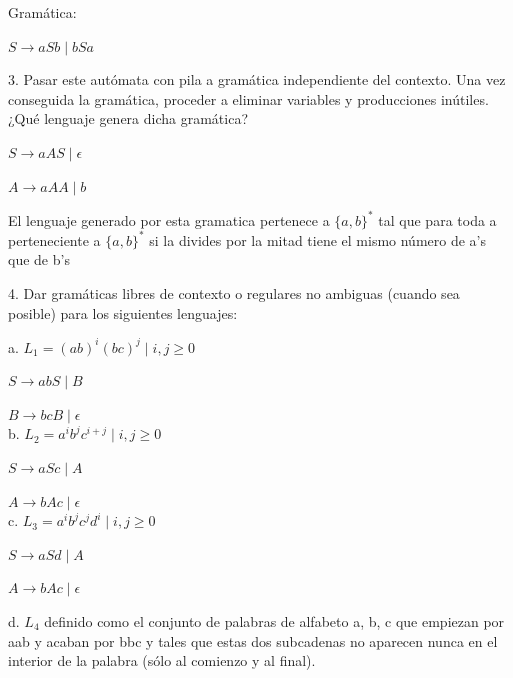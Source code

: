 \documentclass{article}
\begin{document}
\hspace{1cm} Gramática:

\hspace{2cm} $S \rightarrow aSb \mid bSa$

\vspace{0,65cm}

3. Pasar  este  autómata  con  pila  a  gramática  independiente  del  contexto.  Una  vez conseguida  la  gramática, proceder a  eliminar  variables  y  producciones inútiles.  ¿Qué lenguaje genera dicha gramática? 

\hspace{1cm} $S \rightarrow aAS \mid \epsilon$

\hspace{1cm} $A \rightarrow aAA \mid b$

El lenguaje generado por esta gramatica  pertenece a $\{a,b\}^{*}$ tal que para toda a perteneciente a $\{a,b\}^{*}$ si la divides por la mitad tiene el mismo número de a's que de b's

\vspace{0,65cm}

4. Dar gramáticas libres de contexto o regulares no ambiguas (cuando sea posible) para los siguientes lenguajes: 

\hspace{1cm} a. $L_{1} = {(ab)^{i}(bc)^{j} \mid i,j \ge  0}$

\hspace{2cm} 	$S \rightarrow abS \mid B$

\hspace{2cm} 	$B \rightarrow bcB \mid \epsilon$\\

\hspace{1cm} b. $L_{2} = {a^{i}b^{j}c^{i+j} \mid i,j \ge  0}$

\hspace{2cm} 	$S \rightarrow aSc \mid A$

\hspace{2cm} 	$A \rightarrow bAc \mid \epsilon$\\

\hspace{1cm} c. $L_{3} = {a^{i}b^{j}c^{j}d^{i} \mid i,j \ge  0}$

\hspace{2cm} 	$S \rightarrow aSd \mid A$

\hspace{2cm} 	$A \rightarrow bAc \mid \epsilon$

\hspace{1cm} d. $L_{4}$ definido como el conjunto de palabras de alfabeto {a, b, c} que empiezan por aab y acaban por bbc y tales que estas dos subcadenas no aparecen nunca en el interior de la palabra (sólo al comienzo y al final).
\end{document}

